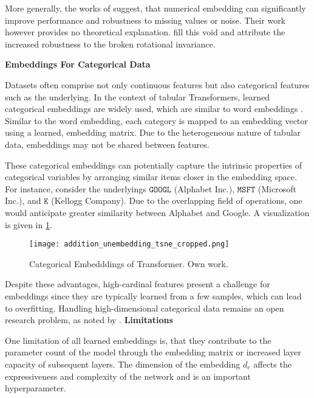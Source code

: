 More generally, the works of \textcites[][1]{gorishniyEmbeddingsNumericalFeatures2022}[][1]{somepalliSAINTImprovedNeural2021} suggest, that numerical embedding can significantly improve performance and robustness to missing values or noise. Their work however provides no theoretical explanation. \textcite[][8--9]{grinsztajnWhyTreebasedModels2022} fill this void and attribute the increased robustness to the broken rotational invariance.

\textbf{Embeddings For Categorical Data}

Datasets often comprise not only continuous features but also categorical features such as the underlying. In the context of tabular Transformers, learned categorical embeddings are widely used, which are similar to word embeddings \autocites[][1]{wangTransTabLearningTransferable}[][1]{gorishniyRevisitingDeepLearning2021}[][1]{huangTabTransformerTabularData2020}[][1]{somepalliSAINTImprovedNeural2021}. Similar to the word embedding, each category is mapped to an embedding vector using a learned, embedding matrix. Due to the heterogeneous nature of tabular data, embeddings may not be shared between features.

These categorical embeddings can potentially capture the intrinsic properties of categorical variables by arranging similar items closer in the embedding space.  For instance, consider the underlyings $\mathtt{GOOGL}$ (Alphabet Inc.), $\mathtt{MSFT}$ (Microsoft Inc.), and $\mathtt{K}$ (Kellogg Company). Due to the overlapping field of operations, one would anticipate greater similarity between Alphabet and Google. A visualization is given in \cref{fig:categorical-embeddings}.

\begin{figure}[h]
    \centering
    \texttt{[image: addition\_unembedding\_tsne\_cropped.png]}
    \caption[Categorical Embedddings of Transformer]{Categorical Embedddings of Transformer. Own work.}
    \label{fig:categorical-embeddings}
\end{figure}

Despite these advantages, high-cardinal features present a challenge for embeddings since they are typically learned from a few samples, which can lead to overfitting. Handling high-dimensional categorical data remains an open research problem, as noted by \autocite[][2]{borisovDeepNeuralNetworks2022}.
\textbf{Limitations}

One limitation of all learned embeddings is, that they contribute to the parameter count of the model through the embedding matrix or increased layer capacity of subsequent layers. The dimension of the embedding $d_{e}$ affects the expressiveness and complexity of the network and is an important hyperparameter.

